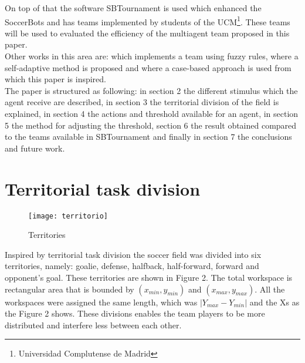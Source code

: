 \documentclass[
10pt, %
a4paper, %
oneside, %
headinclude,footinclude, %
BCOR5mm, %
]{scrartcl}
\begin{document}
On top of that the software SBTournament is used which enhanced the SoccerBots and has teams implemented by students of the UCM\footnote{Universidad Complutense de Madrid}. These teams will be used to evaluated the efficiency of the multiagent team proposed in this paper.\\ 

Other works in this area are: \cite{wu2004fuzzy} which implements a team using fuzzy rules, \cite{shi2015research} where a self-adaptive method is proposed and \cite{ros2009case} where a case-based approach is used from which this paper is inspired.\\

The paper is structured as following: in section 2 the different stimulus which the agent receive are described, in section 3 the territorial division of the field is explained, in section 4 the actions and threshold available for an agent, in section 5 the method for adjusting the threshold, section 6 the result obtained compared to the teams available in SBTournament and finally in section 7 the conclusions and future work.  


\section{Territorial task division}

\begin{figure}
	\centering
	\texttt{[image: territorio]}
	\caption{Territories}
	\label{fig:fig}
\end{figure}

Inspired by \cite{baghaei2007multi} territorial task division the soccer field was divided into six
territories, namely: goalie, defense, halfback, half-forward, forward and opponent's goal. These territories are shown in Figure 2. The total workspace is rectangular area that is bounded by $(x_{min}, y_{min})$ and $(x_{max}, y_{max})$. All the workspaces were assigned the same length, which was $|Y_{max} - Y_{min}|$ and the Xs as the Figure 2 shows. These divisions enables the team players to be more distributed and interfere   less between each other.  
 
\end{document}
